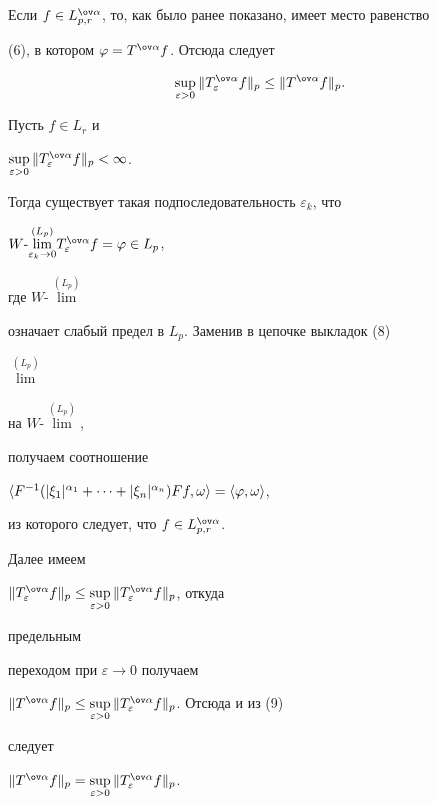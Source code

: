 \begin{pf}


Если $f\in\spaceL$, то, как было ранее показано, имеет место равенство


(6), в котором $\varphi=T^{\ov\alpha}f$. Отсюда следует


\begin{equation}


\sup_{\varepsilon>0}\|T^{\ov\alpha}_\varepsilon f\|_p\le


\|T^{\ov\alpha}f\|_p.


\end{equation}





Пусть $f\in L_r$ и


$\sup\limits_{\varepsilon>0}\|T^{\ov\alpha}_\varepsilon f\|_p<\infty$.


Тогда существует такая подпоследовательность $\varepsilon_k$, что


$W\text{-}\overset{(L_p)}{\lim\limits_{\varepsilon_k\to 0}}{}


T^{\ov\alpha}_\varepsilon f=\varphi\in L_p$,


где $W\text{-}\overset{(L_p)}{\lim}{}$


означает слабый предел в $L_p$. Заменив в цепочке выкладок (8)


$\overset{(L_p)}{\lim}{}$


на $W\text{-}\overset{(L_p)}{\lim}{}$,


получаем соотношение


$\la F^{-1}(|\xi_1|^{\alpha_1}+\dotsb+|\xi_n|^{\alpha_n})


Ff,\omega\ra=\la\varphi,\omega\ra$,


из которого следует, что $f\in\spaceL$.





Далее имеем


$\|T^{\ov\alpha}_\varepsilon f\|_p\le\sup\limits_{\varepsilon>0}


\|T^{\ov\alpha}_\varepsilon f\|_p$, откуда


предельным


переходом при $\varepsilon\to 0$ получаем


$\|T^{\ov\alpha}f\|_p\le\sup\limits_{\varepsilon>0}


\|T^{\ov\alpha}_\varepsilon f\|_p$. Отсюда и из (9)


следует 


$\|T^{\ov\alpha}f\|_p=\sup\limits_{\varepsilon>0}


\|T^{\ov\alpha}_\varepsilon f\|_p$.


\end{pf}





